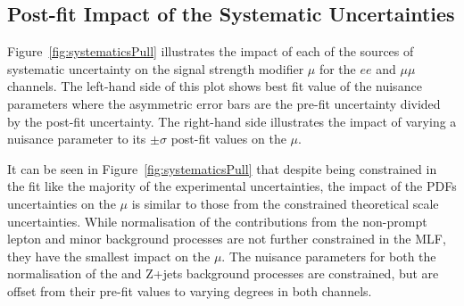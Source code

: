 \subsection{Post-fit Impact of the Systematic Uncertainties}\label{sec:uncertainitiesImpact}
Figure~\ref{fig:systematicsPull} illustrates the impact of each of the sources of systematic uncertainty on the signal strength modifier $\mu$ for the $ee$ and $\mu\mu$ channels.
The left-hand side of this plot shows best fit value of the nuisance parameters where the asymmetric error bars are the pre-fit uncertainty divided by the post-fit uncertainty.
The right-hand side illustrates the impact of varying a nuisance parameter to its $\pm \sigma$ post-fit values on the $\mu$.

It can be seen in Figure~\ref{fig:systematicsPull} that despite being constrained in the fit like the majority of the experimental uncertainties, the impact of the PDFs uncertainties on the $\mu$ is similar to those from the constrained theoretical scale uncertainties.
While normalisation of the contributions from the non-prompt lepton and minor background processes are not further constrained in the MLF, they have the smallest impact on the $\mu$.
The nuisance parameters for both the normalisation of the \ttbar and Z+jets background processes are constrained, but are offset from their pre-fit values to varying degrees in both channels.


